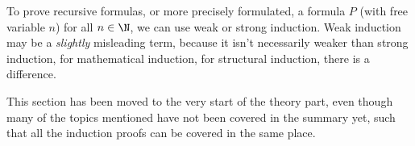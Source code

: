 To prove recursive formulas, or more precisely formulated, a formula $P$ (with free variable $n$) for all $n \in \N$,
we can use weak or strong induction.
Weak induction may be a \textit{slightly} misleading term, because it isn't necessarily weaker than strong induction,
for mathematical induction, for structural induction, there is a difference.

This section has been moved to the very start of the theory part, even though many of the topics mentioned have not been covered in the summary yet,
such that all the induction proofs can be covered in the same place.

